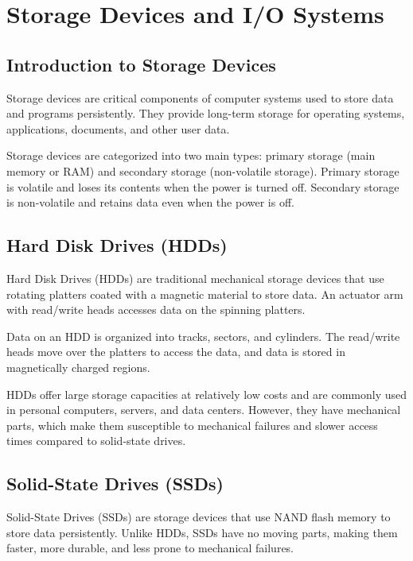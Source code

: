 \documentclass{article}
\begin{document}
\section{Storage Devices and I/O Systems}

\subsection{Introduction to Storage Devices}

Storage devices are critical components of computer systems used to store data and programs persistently. They provide long-term storage for operating systems, applications, documents, and other user data.

Storage devices are categorized into two main types: primary storage (main memory or RAM) and secondary storage (non-volatile storage). Primary storage is volatile and loses its contents when the power is turned off. Secondary storage is non-volatile and retains data even when the power is off.

\subsection{Hard Disk Drives (HDDs)}

Hard Disk Drives (HDDs) are traditional mechanical storage devices that use rotating platters coated with a magnetic material to store data. An actuator arm with read/write heads accesses data on the spinning platters.

Data on an HDD is organized into tracks, sectors, and cylinders. The read/write heads move over the platters to access the data, and data is stored in magnetically charged regions.

HDDs offer large storage capacities at relatively low costs and are commonly used in personal computers, servers, and data centers. However, they have mechanical parts, which make them susceptible to mechanical failures and slower access times compared to solid-state drives.

\subsection{Solid-State Drives (SSDs)}

Solid-State Drives (SSDs) are storage devices that use NAND flash memory to store data persistently. Unlike HDDs, SSDs have no moving parts, making them faster, more durable, and less prone to mechanical failures.
\end{document}
